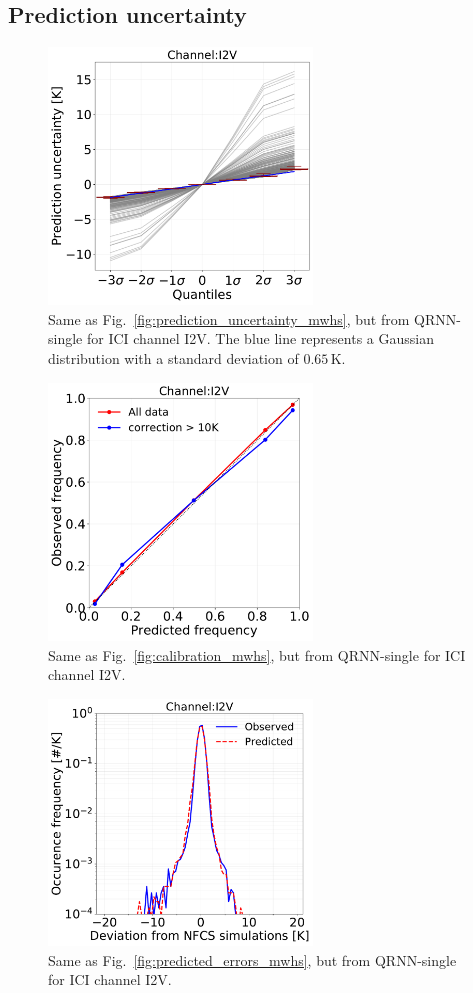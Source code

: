 \documentclass[amt, manuscript]{copernicus}
\begin{document}
\subsection{Prediction uncertainty}
\label{sec:prediction_uncertainty}
\begin{figure}[t]
	\includegraphics[width = 70mm]{Figures/fig09.pdf}	
	\caption{Same as Fig.~\ref{fig:prediction_uncertainty_mwhs}, but from QRNN-single for ICI channel I2V. The blue line represents a Gaussian distribution with a standard deviation of $0.65$\,K.}
	\label{fig:prediction_uncertainty_I2V}	
\end{figure}
\begin{figure}[t]
	\includegraphics[width = 70mm]{Figures/fig10.pdf}	
	\caption{Same as Fig.~\ref{fig:calibration_mwhs}, but from QRNN-single for ICI channel I2V. }
	\label{fig:calibration_I2V}	
\end{figure}
\begin{figure}[t]
	\includegraphics[width=70mm]{Figures/fig11.pdf}	
	\caption{Same as Fig.~\ref{fig:predicted_errors_mwhs}, but from QRNN-single for ICI channel I2V.}
	\label{fig:predicted_errors}	
\end{figure}
\end{document}
